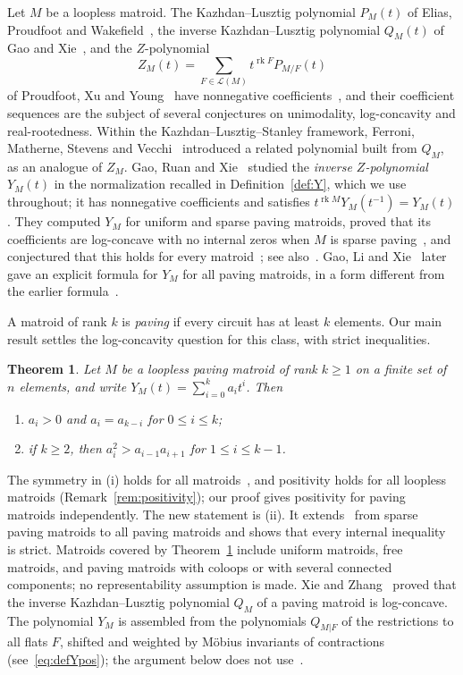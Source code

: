 \documentclass[11pt]{amsart}
\newtheorem{theorem}{Theorem}[section]
\theoremstyle{definition}
\theoremstyle{remark}
\numberwithin{equation}{section}
\DeclareMathOperator{\rk}{rk}
\newcommand{\cL}{\mathcal{L}}
\begin{document}
Let $M$ be a loopless matroid. The Kazhdan--Lusztig polynomial $P_M(t)$ of Elias, Proudfoot and Wakefield~\cite{EPW}, the inverse Kazhdan--Lusztig polynomial $Q_M(t)$ of Gao and Xie~\cite{GX}, and the $Z$-polynomial
\[
Z_M(t)=\sum_{F\in\cL(M)} t^{\rk F}P_{M/F}(t)
\]
of Proudfoot, Xu and Young~\cite{PXY} have nonnegative coefficients~\cite{BHMPW}, and their coefficient sequences are the subject of several conjectures on unimodality, log-concavity and real-rootedness. Within the Kazhdan--Lusztig--Stanley framework, Ferroni, Matherne, Stevens and Vecchi~\cite[p.~19, footnote~7]{FMSV} introduced a related polynomial built from $Q_M$, as an analogue of $Z_M$. Gao, Ruan and Xie~\cite{GRX} studied the \emph{inverse $Z$-polynomial} $Y_M(t)$ in the normalization recalled in Definition~\ref{def:Y}, which we use throughout; it has nonnegative coefficients and satisfies $t^{\rk M}Y_M(t^{-1})=Y_M(t)$. They computed $Y_M$ for uniform and sparse paving matroids, proved that its coefficients are log-concave with no internal zeros when $M$ is sparse paving~\cite[Theorem~1.6]{GRX}, and conjectured that this holds for every matroid~\cite[Conjectures~1.4 and~1.5]{GRX}; see also~\cite[Conjecture~1.2(d)]{BFMN}. Gao, Li and Xie~\cite[Theorem~1.7]{GLX} later gave an explicit formula for $Y_M$ for all paving matroids, in a form different from the earlier formula~\cite[Proposition~5.3]{GRX}.

A matroid of rank $k$ is \emph{paving} if every circuit has at least $k$ elements. Our main result settles the log-concavity question for this class, with strict inequalities.

\begin{theorem}\label{thm:main}
Let $M$ be a loopless paving matroid of rank $k\ge 1$ on a finite set of $n$ elements, and write $Y_M(t)=\sum_{i=0}^{k}a_it^i$. Then
\begin{enumerate}
\item[(i)] $a_i>0$ and $a_i=a_{k-i}$ for $0\le i\le k$;
\item[(ii)] if $k\ge 2$, then $a_i^2>a_{i-1}a_{i+1}$ for $1\le i\le k-1$.
\end{enumerate}
\end{theorem}

The symmetry in (i) holds for all matroids~\cite[Lemma~2.2]{GRX}, and positivity holds for all loopless matroids (Remark~\ref{rem:positivity}); our proof gives positivity for paving matroids independently. The new statement is (ii). It extends~\cite[Theorem~1.6]{GRX} from sparse paving matroids to all paving matroids and shows that every internal inequality is strict. Matroids covered by Theorem~\ref{thm:main} include uniform matroids, free matroids, and paving matroids with coloops or with several connected components; no representability assumption is made. Xie and Zhang~\cite{XZ} proved that the inverse Kazhdan--Lusztig polynomial $Q_M$ of a paving matroid is log-concave. The polynomial $Y_M$ is assembled from the polynomials $Q_{M|F}$ of the restrictions to all flats $F$, shifted and weighted by Möbius invariants of contractions (see~\eqref{eq:defYpos}); the argument below does not use~\cite{XZ}.
\end{document}

